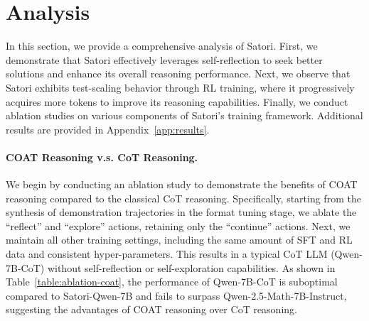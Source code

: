 \section{Analysis} \label{sec:analysis}
In this section, we provide a comprehensive analysis of Satori. First, we demonstrate that Satori effectively leverages self-reflection to seek better solutions and enhance its overall reasoning performance. Next, we observe that Satori exhibits test-scaling behavior through RL training, where it progressively acquires more tokens to improve its reasoning capabilities. Finally, we conduct ablation studies on various components of Satori's training framework. Additional results are provided in Appendix~\ref{app:results}.



\paragraph{COAT Reasoning v.s. CoT Reasoning.}

We begin by conducting an ablation study to demonstrate the benefits of COAT reasoning compared to the classical CoT reasoning. Specifically, starting from the synthesis of demonstration trajectories in the format tuning stage, we ablate the ``reflect'' and  ``explore'' actions, retaining only the ``continue'' actions. Next, we maintain all other training settings, including the same amount of SFT and RL data and consistent hyper-parameters. This results in a typical CoT LLM (Qwen-7B-CoT) without self-reflection or self-exploration capabilities. As shown in Table~\ref{table:ablation-coat}, the performance of Qwen-7B-CoT is suboptimal compared to Satori-Qwen-7B and fails to surpass Qwen-2.5-Math-7B-Instruct, suggesting the advantages of COAT reasoning over CoT reasoning.



